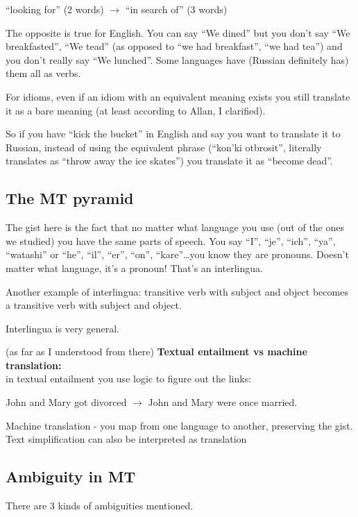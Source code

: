 ``looking for'' (2 words) $\rightarrow$ ``in search of'' (3 words)

The opposite is true for English. You can say ``We dined'' but you don't say
``We breakfasted'', ``We tead'' (as opposed to ``we had breakfast'', ``we had
tea'') and you don't really say ``We lunched''. Some languages have (Russian
definitely has) them all as verbs.

For idioms, even if an idiom with an equivalent meaning exists you still
translate it as a bare meaning (at least according to Allan, I clarified).

So if you have ``kick the bucket'' in English and say you want to translate it
to Russian, instead of using the equivalent phrase (``kon'ki otbrosit'',
literally translates as ``throw away the ice skates'') you translate it as
``become dead''.

\subsection{The MT pyramid} 

The gist here is the fact that no matter what language you use (out of the ones
we studied) you have the same parts of speech. You say ``I'', ``je'', ``ich'',
``ya'', ``watashi'' or ``he'', ``il'', ``er'', ``on'', ``kare''\ldots you know 
they are pronouns. Doesn't matter what language, it's a pronoun! That's an
interlingua.

Another example of interlingua: transitive verb with subject and object becomes
a transitive verb with subject and object.

Interlingua is very general.

 (as far as I understood from there)  
\textbf{Textual entailment vs machine translation:}\\ 
in textual entailment you use logic to figure out the links:

John and Mary got divorced $\rightarrow$ John and Mary were once married.

Machine translation - you map from one language to another, preserving the gist.
Text simplification can also be interpreted as translation 

\subsection{Ambiguity in MT} 
There are 3 kinds of ambiguities mentioned. 

